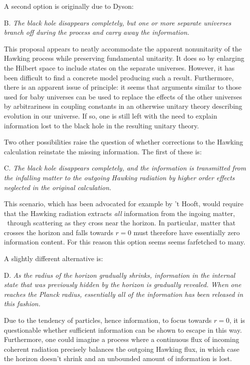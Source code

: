 A second option is originally due to Dyson:

\item{B.} {\it The black hole disappears completely, but one or more
separate universes branch off during the process and carry away the
information. }

This proposal appears to neatly accommodate the apparent nonunitarity of the
Hawking process while preserving fundamental unitarity.  It does so by
enlarging
the Hilbert space to include states on the separate universes.  However, it
has been difficult to find a concrete model producing such a result.
Furthermore, there is an apparent issue of principle:  it seems that arguments
similar to those used for baby universes can
be used to replace the effects of the other universes by
arbitrariness in coupling constants in an otherwise unitary theory
describing evolution in
our universe.  If so,
one is still left with the need to explain
information lost to the black hole in the resulting unitary
theory.

Two other possibilities raise the question of whether corrections to
the Hawking calculation reinstate the missing information.  The first
of these is:

\item{C.}  {\it The black hole disappears completely, and the information
is transmitted from the infalling matter to the outgoing Hawking
radiation by higher order effects neglected in the original
calculation.  }

This scenario, which has been advocated for example by 't Hooft,
would require that the Hawking radiation
extracts {\it all} information from the ingoing matter, \eg\ through scattering
as they cross near the horizon.  In particular, matter that crosses the
horizon and falls towards $r=0$ must therefore have essentially zero
information
content.  For this reason this option seems
seems farfetched to many.

A slightly different alternative  is:

\item{D.}  {\it As the radius of the horizon gradually shrinks,
information in the internal state that was previously hidden by the
horizon is gradually revealed.  When one reaches the Planck radius,
essentially all of the information has been released in this
fashion.}

Due to the tendency of particles, hence information, to focus towards
$r=0$, it is questionable whether sufficient information can be shown
to escape in this way.  Furthermore, one could imagine a process where a
continuous flux of incoming coherent radiation precisely balances the outgoing
Hawking flux, in which case the horizon doesn't shrink and an unbounded
amount of information is lost.

